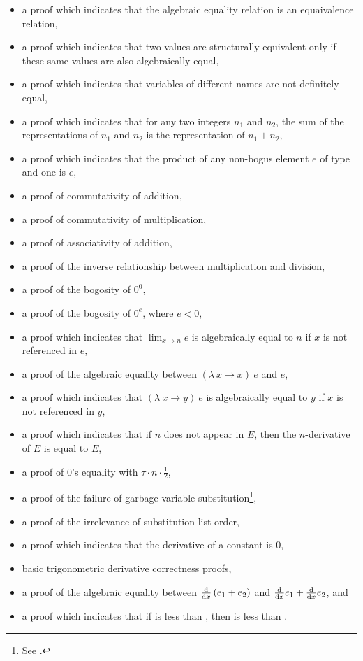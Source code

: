 \documentclass{report}
\begin{document}
\begin{itemize}
 \item a proof which indicates that the algebraic equality relation is an equaivalence relation,
 \item a proof which indicates that two values are structurally equivalent only if these same values are also algebraically equal,
 \item a proof which indicates that variables of different names are not definitely equal,
 \item a proof which indicates that for any two integers \(n_1\) and \(n_2\), the sum of the representations of \(n_1\) and \(n_2\) is the representation of \(n_1 + n_2\),
 \item a proof which indicates that the product of any non-bogus element \(e\) of type  and one is \(e\),
 \item a proof of commutativity of addition,
 \item a proof of commutativity of multiplication,
 \item a proof of associativity of addition,
 \item a proof of the inverse relationship between multiplication and division,
 \item a proof of the bogosity of \(0^0\),
 \item a proof of the bogosity of \(0^e\), where \(e < 0\),
 \item a proof which indicates that \(\lim_{x \rightarrow n} e\) is algebraically equal to \(n\) if \(x\) is not referenced in \(e\),
 \item a proof of the algebraic equality between \(\left(\lambda\ x \rightarrow x\right)\ e\) and \(e\),
 \item a proof which indicates that \(\left(\lambda\ x \rightarrow y\right)\ e\) is algebraically equal to \(y\) if \(x\) is not referenced in \(y\),
 \item a proof which indicates that if \(n\) does not appear in \(E\), then the \(n\)-derivative of \(E\) is equal to \(E\),
 \item a proof of \(0\)'s equality with \(\tau \cdot n \cdot \frac12\),
 \item a proof of the failure of garbage variable substitution\footnote{See .},
 \item a proof of the irrelevance of substitution list order,
 \item a proof which indicates that the derivative of a constant is \(0\),
 \item basic trigonometric derivative correctness proofs,
 \item a proof of the algebraic equality between \(\derivative{x} \left(e_1 + e_2\right)\) and \(\derivative{x} e_1 + \derivative{x} e_2\), and
 \item a proof which indicates that if  is less than , then   is less than  .
\end{itemize}
\end{document}
